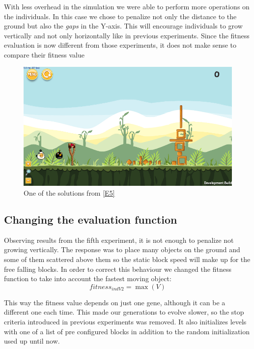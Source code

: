 \documentclass[sigconf]{acmart}
\begin{document}
With less overhead in the simulation we were able to perform more
operations on the individuals. In this case we chose to penalize
not only the distance to the ground but also the \textit{gaps} in the Y-axis.
This will encourage individuals to grow vertically and not only horizontally
like in previous experiments. Since the fitness evaluation is now different
from those experiments, it does not make sense to compare their fitness value
 \begin{figure}
 	\centering
 	\includegraphics[scale=0.3]{E5.png}
 	\caption{One of the solutions from \ref{E5}}\label{f:e5}
 \end{figure}
\subsection{Changing the evaluation function}\label{E6}

Observing results from the fifth experiment, it is not enough to penalize
not growing vertically. The response was to place many objects on the ground
and some of them scattered above them so the static block speed will make up
for the free falling blocks. In order to correct this behaviour we changed the
fitness function to take into account the fastest moving object:
$$fitness_{indV2} = \max{(V)}$$

This way the fitness value depends on just one gene, although it can be a
different one each time. This made our generations to evolve slower, so the
stop criteria introduced in previous experiments was removed.
It also initializes levels with one of a list of pre configured
blocks in addition to the random initialization used up until now.
\end{document}
